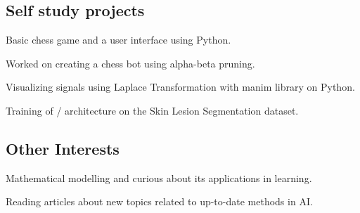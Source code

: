 \documentclass[letter, 14pt]{article}
\begin{document}


\subsection{Self study projects}
\subtext{}
\begin{zitemize}
\item Basic chess game and a user interface using Python. \href{https://github.com/denizberkin/test_chess}{\color{black}\externallink}
\item Worked on creating a chess bot using alpha-beta pruning.
\item Visualizing signals using Laplace Transformation with manim library on Python.
\item Training of \href{https://arxiv.org/pdf/1505.04597}{\color{black}{UNet}}/\href{https://arxiv.org/pdf/2201.01266}{\color{black}{SwinUnetR}} architecture on the Skin Lesion Segmentation dataset.
\end{zitemize}


\subsection{Other Interests}
\begin{zitemize}
\item Mathematical modelling and curious about its applications in learning.
\item Reading articles about new topics related to up-to-date methods in AI.
\end{zitemize}
\end{document}
